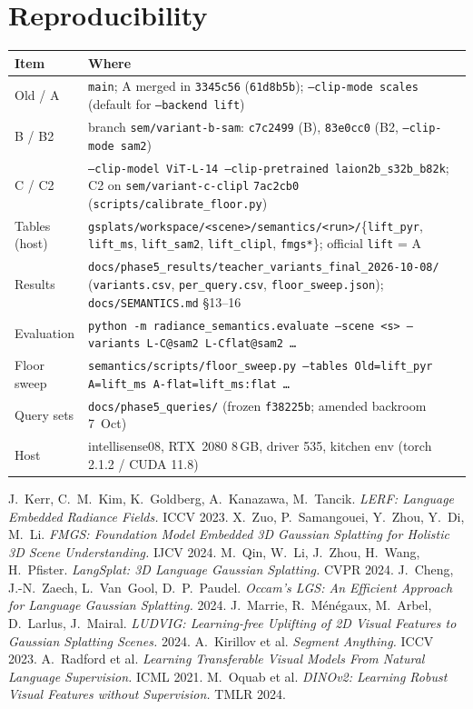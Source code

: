 \documentclass[11pt,a4paper]{article}
\newcommand{\code}[1]{\texttt{#1}}
\begin{document}
\section{Reproducibility}
\begin{table}[ht]
\centering\footnotesize
\begin{tabularx}{\linewidth}{@{}lL@{}}
\toprule
Item & Where \\
\midrule
Old / A & \code{main}; A merged in \code{3345c56} (\code{61d8b5b}); \code{--clip-mode scales} (default for \code{--backend lift}) \\
B / B2 & branch \code{sem/variant-b-sam}: \code{c7c2499} (B), \code{83e0cc0} (B2, \code{--clip-mode sam2}) \\
C / C2 & \code{--clip-model ViT-L-14 --clip-pretrained laion2b\_s32b\_b82k}; C2 on \code{sem/variant-c-clipl} \code{7ac2cb0}
  (\code{scripts/calibrate\_floor.py}) \\
Tables (host) & \code{gsplats/workspace/<scene>/semantics/<run>/}\{\code{lift\_pyr}, \code{lift\_ms}, \code{lift\_sam2},
  \code{lift\_clipl}, \code{fmgs*}\}; official \code{lift} = A \\
Results & \code{docs/phase5\_results/teacher\_variants\_final\_2026-10-08/} (\code{variants.csv}, \code{per\_query.csv},
  \code{floor\_sweep.json}); \code{docs/SEMANTICS.md} \S13--16 \\
Evaluation & \code{python -m radiance\_semantics.evaluate --scene <s> --variants L-C@sam2 L-Cflat@sam2 \dots} \\
Floor sweep & \code{semantics/scripts/floor\_sweep.py --tables Old=lift\_pyr A=lift\_ms A-flat=lift\_ms:flat \dots} \\
Query sets & \code{docs/phase5\_queries/} (frozen \code{f38225b}; amended backroom 7~Oct) \\
Host & intellisense08, RTX~2080 8\,GB, driver 535, kitchen env (torch 2.1.2 / CUDA 11.8) \\
\bottomrule
\end{tabularx}
\end{table}

\FloatBarrier
\begin{thebibliography}{9}
 J.~Kerr, C.~M.~Kim, K.~Goldberg, A.~Kanazawa, M.~Tancik. \emph{LERF: Language Embedded Radiance Fields.} ICCV 2023.
 X.~Zuo, P.~Samangouei, Y.~Zhou, Y.~Di, M.~Li. \emph{FMGS: Foundation Model Embedded 3D Gaussian Splatting for Holistic 3D Scene Understanding.} IJCV 2024.
 M.~Qin, W.~Li, J.~Zhou, H.~Wang, H.~Pfister. \emph{LangSplat: 3D Language Gaussian Splatting.} CVPR 2024.
 J.~Cheng, J.-N.~Zaech, L.~Van~Gool, D.~P.~Paudel. \emph{Occam's LGS: An Efficient Approach for Language Gaussian Splatting.} 2024.
 J.~Marrie, R.~M\'en\'egaux, M.~Arbel, D.~Larlus, J.~Mairal. \emph{LUDVIG: Learning-free Uplifting of 2D Visual Features to Gaussian Splatting Scenes.} 2024.
 A.~Kirillov et al. \emph{Segment Anything.} ICCV 2023.
 A.~Radford et al. \emph{Learning Transferable Visual Models From Natural Language Supervision.} ICML 2021.
 M.~Oquab et al. \emph{DINOv2: Learning Robust Visual Features without Supervision.} TMLR 2024.
\end{thebibliography}
\end{document}
